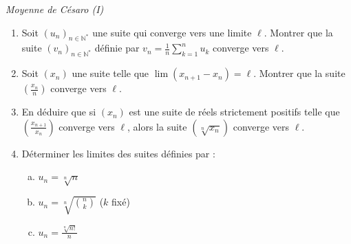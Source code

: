 \documentclass[]{exercices}
\begin{document}
\begin{exercice}[\st] \emph{Moyenne de Césaro (I)}
	\begin{enumerate}
		\item Soit $(u_n)_{n\in \mathbb{N}^*}$ une suite qui converge vers une limite $\ell$. Montrer que la suite $(v_n)_{n\in \mathbb{N}^*}$ définie par $v_n=\frac{1}{n}\sum_{k=1}^n u_k$ converge vers $\ell$.
		\item Soit $(x_n)$ une suite telle que $\lim (x_{n+1}-x_n)=\ell$. Montrer que la suite $(\frac{x_n}{n})$ converge vers $\ell$.
		\item En déduire que si $(x_n)$ est une suite de réels strictement positifs telle que $(\frac{x_{n+1}}{x_n})$ converge vers $\ell$, alors la suite $(\sqrt[n]{x_n})$ converge vers $\ell$.
		\item Déterminer les limites des suites définies par :
		      \begin{multicols}{3}
			      \begin{enumerate}[a)]
				      \item $u_n=\sqrt[n]{n}$
				      \item $u_n=\sqrt[n]{\binom{n}{k}}$ ($k$ fixé)
				      \item $u_n=\frac{\sqrt[n]{n!}}{n}$
			      \end{enumerate}
		      \end{multicols}
	\end{enumerate}
\end{exercice}
\end{document}

